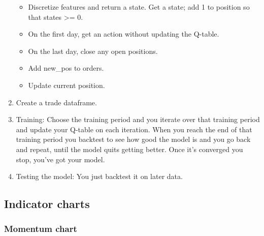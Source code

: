 \documentclass[11pt]{article}
\providecommand{\tightlist}{%
      \setlength{\itemsep}{0pt}\setlength{\parskip}{0pt}}
\begin{document}
\begin{enumerate}
  \begin{itemize}
  \tightlist
  \item
    Discretize features and return a state. Get a state; add 1 to
    position so that states \textgreater{}= 0.
  \item
    On the first day, get an action without updating the Q-table.
  \item
    On the last day, close any open positions.
  \item
    Add new\_pos to orders.
  \item
    Update current position.
  \end{itemize}
\item
  Create a trade dataframe.
\item
  Training: Choose the training period and you iterate over that
  training period and update your Q-table on each iteration. When you
  reach the end of that training period you backtest to see how good the
  model is and you go back and repeat, until the model quits getting
  better. Once it's converged you stop, you've got your model.
\item
  Testing the model: You just backtest it on later data.
\end{enumerate}

    \subsection{Indicator charts}\label{indicator-charts}

    \subsubsection{Momentum chart}\label{momentum-chart}
\end{document}
